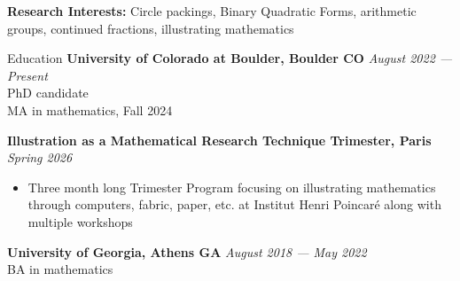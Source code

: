 \documentclass{resume} %
\begin{document}
\textbf{Research Interests:} Circle packings, Binary Quadratic Forms, arithmetic groups, continued fractions, illustrating mathematics


\begin{rSection}{Education}
{\bf University of Colorado at Boulder, Boulder CO} \hfill {\em August 2022 --- Present} \\
PhD candidate \\
MA in mathematics, Fall 2024

{\bf Illustration as a Mathematical Research Technique Trimester, Paris} \hfill {\em Spring 2026}
    \begin{itemize}
        \item Three month long Trimester Program focusing on illustrating mathematics through computers, fabric, paper, etc. at Institut Henri Poincaré along with multiple workshops
    \end{itemize}

{\bf University of Georgia, Athens GA} \hfill {\em August 2018 --- May 2022} 
\\ BA in mathematics \\


\end{rSection}
\end{document}

